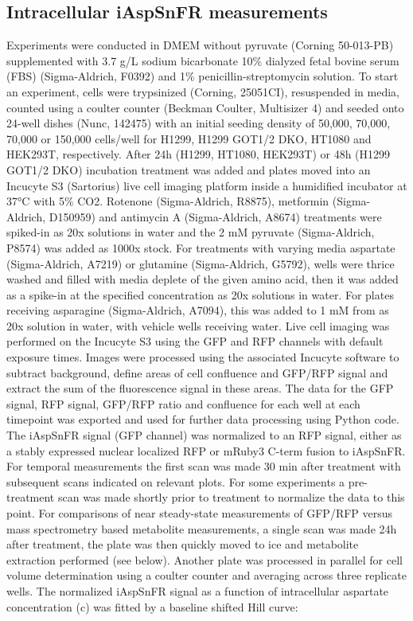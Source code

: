 \documentclass[9pt,lineno]{elife}
\begin{document}
\subsection{Intracellular iAspSnFR measurements}
Experiments were conducted in DMEM without pyruvate (Corning 50-013-PB) supplemented with 3.7 g/L sodium bicarbonate 10\% dialyzed fetal bovine serum (FBS) (Sigma-Aldrich, F0392) and 1\% penicillin-streptomycin solution.
To start an experiment, cells were trypsinized (Corning, 25051CI), resuspended in media, counted using a coulter counter (Beckman Coulter, Multisizer 4) and seeded onto 24-well dishes (Nunc, 142475) with an initial seeding density of 50,000, 70,000, 70,000 or 150,000 cells/well for H1299, H1299 GOT1/2 DKO, HT1080 and HEK293T, respectively.
After 24h (H1299, HT1080, HEK293T) or 48h (H1299 GOT1/2 DKO) incubation treatment was added and plates moved into an Incucyte S3 (Sartorius) live cell imaging platform inside a humidified incubator at 37°C with 5\% CO2.
Rotenone (Sigma-Aldrich, R8875), metformin (Sigma-Aldrich, D150959) and antimycin A (Sigma-Aldrich, A8674) treatments were spiked-in as 20x solutions in water and the 2 mM pyruvate (Sigma-Aldrich, P8574) was added as 1000x stock.
For treatments with varying media aspartate (Sigma-Aldrich, A7219) or glutamine (Sigma-Aldrich, G5792), wells were thrice washed and filled with media deplete of the given amino acid, then it was added as a spike-in at the specified concentration as 20x solutions in water.
For plates receiving asparagine (Sigma-Aldrich, A7094), this was added to 1 mM from as 20x solution in water, with vehicle wells receiving water.
Live cell imaging was performed on the Incucyte S3 using the GFP and RFP channels with default exposure times.
Images were processed using the associated Incucyte software to subtract background, define areas of cell confluence and GFP/RFP signal and extract the sum of the fluorescence signal in these areas.
The data for the GFP signal, RFP signal, GFP/RFP ratio and confluence for each well at each timepoint was exported and used for further data processing using Python code.
The iAspSnFR signal (GFP channel) was normalized to an RFP signal, either as a stably expressed nuclear localized RFP or mRuby3 C-term fusion to iAspSnFR.
For temporal measurements the first scan was made 30 min after treatment with subsequent scans indicated on relevant plots.
For some experiments a pre-treatment scan was made shortly prior to treatment to normalize the data to this point.
For comparisons of near steady-state measurements of GFP/RFP versus mass spectrometry based metabolite measurements, a single scan was made 24h after treatment, the plate was then quickly moved to ice and metabolite extraction performed (see below).
Another plate was processed in parallel for cell volume determination using a coulter counter and averaging across three replicate wells.
The normalized iAspSnFR signal as a function of intracellular aspartate concentration (c) was fitted by a baseline shifted Hill curve:
\end{document}
